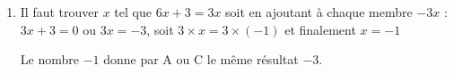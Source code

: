 \begin{enumerate}
\begin{enumerate}
Donc le programme B donne à partir de $- 3$ et à partir de 5 le nombre $0$.
	\end{enumerate}
	\item %
Il faut trouver $x$ tel que $6x + 3 = 3x$ soit en ajoutant à chaque membre $- 3x$ : $3x + 3 = 0$ ou $3x = - 3$, soit $3\times x = 3 \times (- 1)$ et finalement $x = - 1$

Le nombre $- 1$ donne par A ou C le même résultat $- 3$.
\end{enumerate}

\vspace{0,5cm}

